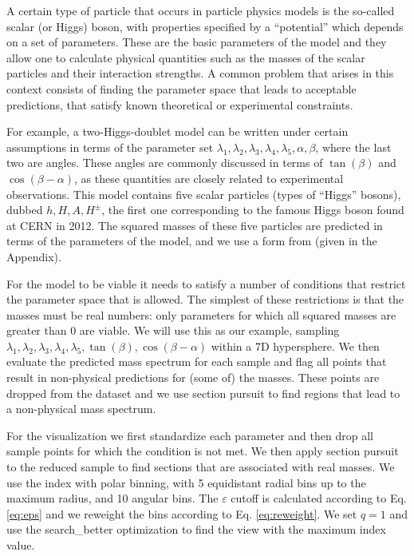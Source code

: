 \documentclass[]{interact}
\theoremstyle{plain}%
\theoremstyle{definition}
\theoremstyle{remark}
\begin{document}
A certain type of particle that occurs in particle physics models is the
so-called scalar (or Higgs) boson, with properties specified by a
``potential'' which depends on a set of parameters. These are the basic
parameters of the model and they allow one to calculate physical
quantities such as the masses of the scalar particles and their
interaction strengths. A common problem that arises in this context
consists of finding the parameter space that leads to acceptable
predictions, that satisfy known theoretical or experimental constraints.

For example, a two-Higgs-doublet model can be written under certain
assumptions in terms of the parameter set
\(\lambda_1,\lambda_2,\lambda_3,\lambda_4,\lambda_5,\alpha,\beta\),
where the last two are angles. These angles are commonly discussed in
terms of \(\tan(\beta)\) and \(\cos(\beta-\alpha)\), as these quantities
are closely related to experimental observations. This model contains
five scalar particles (types of ``Higgs'' bosons), dubbed
\(h,H,A,H^\pm\), the first one corresponding to the famous Higgs boson
found at CERN in 2012. The squared masses of these five particles are
predicted in terms of the parameters of the model, and we use a form
from \citet{Gunion:2002zf} (given in the Appendix).

For the model to be viable it needs to satisfy a number of conditions
that restrict the parameter space that is allowed. The simplest of these
restrictions is that the masses must be real numbers: only parameters
for which all squared masses are greater than 0 are viable. We will use
this as our example, sampling
\(\lambda_1,\lambda_2,\lambda_3,\lambda_4,\lambda_5,\tan(\beta),\cos(\beta-\alpha)\)
within a 7D hypersphere. We then evaluate the predicted mass spectrum
for each sample and flag all points that result in non-physical
predictions for (some of) the masses. These points are dropped from the
dataset and we use section pursuit to find regions that lead to a
non-physical mass spectrum.

For the visualization we first standardize each parameter and then drop
all sample points for which the condition is not met. We then apply
section pursuit to the reduced sample to find sections that are
associated with real masses. We use the index with polar binning, with 5
equidistant radial bins up to the maximum radius, and 10 angular bins.
The \(\varepsilon\) cutoff is calculated according to Eq. \ref{eq:eps}
and we reweight the bins according to Eq. \ref{eq:reweight}. We set
\(q=1\) and use the search\_better optimization to find the view with
the maximum index value.
\end{document}
